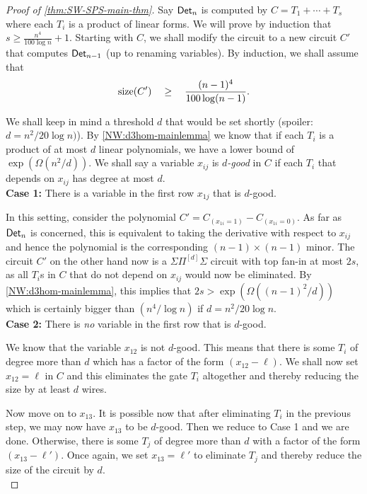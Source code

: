 \begin{proof}[Proof of \autoref{thm:SW-SPS-main-thm}]
 Say $\operatorname{\mathsf{Det}}_n$ is computed by $C = T_1 + \cdots + T_s$ where each $T_i$ is a product of linear forms.
We will prove by induction that $s\geq \frac{n^4}{100\log n} + 1$. Starting with $C$, we shall modify the circuit to a new circuit $C'$ that computes $\operatorname{\mathsf{Det}}_{n-1}$ (up to renaming variables). By induction, we shall assume that 
\[
\mathrm{size}(C') \quad \geq \quad \frac{(n-1)^4}{100\log (n-1)}.
\]

We shall keep in mind a threshold $d$ that would be set shortly (spoiler: $d= n^2/20\log n)$).
By \autoref{NW:d3hom-mainlemma} we know that if each $T_i$ is a product of at most $d$ linear polynomials, we have a lower bound of $\exp(\Omega(n^2/d))$. We shall say a variable $x_{ij}$ is \emph{$d$-good} in $C$ if each $T_i$ that depends on $x_{ij}$ has degree at most $d$. \\

{\bf Case 1:} There is a variable in the first row $x_{1j}$ that is $d$-good. 

\medskip

\noindent 
In this setting, consider the polynomial $C' = C_{(x_{1i} = 1)} - C_{(x_{1i} = 0)}$.
As far as $\operatorname{\mathsf{Det}}_n$ is concerned, this is equivalent to taking the derivative with respect to $x_{ij}$ and hence the polynomial is the corresponding $(n-1)\times (n-1)$ minor.
The circuit $C'$ on the other hand now is a $\Sigma\Pi^{[d]}\Sigma$ circuit with top fan-in at most $2s$, as all $T_i$s in $C$ that do not depend on $x_{ij}$ would now be eliminated.
By \autoref{NW:d3hom-mainlemma}, this implies that $2s > \exp(\Omega((n-1)^2/d))$ which is certainly bigger than $(n^4 / \log n)$ if $d = n^2/20\log n$.\\

{\bf Case 2:} There is \emph{no} variable in the first row that is $d$-good. 

\medskip

\noindent 
We know that the variable $x_{12}$ is not $d$-good.
This means that there is some $T_i$ of degree more than $d$ which has a factor of the form $(x_{12} - \ell)$.
We shall now set $x_{12} = \ell$ in $C$ and this eliminates the gate $T_i$ altogether and thereby reducing the size by at least $d$ wires. 

Now move on to $x_{13}$. It is possible now that after eliminating $T_i$ in the previous step, we may now have $x_{13}$ to be $d$-good. Then we reduce to Case 1 and we are done. Otherwise, there is some $T_j$ of degree more than $d$ with a factor of the form $(x_{13} - \ell')$. Once again, we set $x_{13} = \ell'$ to eliminate $T_j$ and thereby reduce the size of the circuit by $d$. \\


\end{proof}
